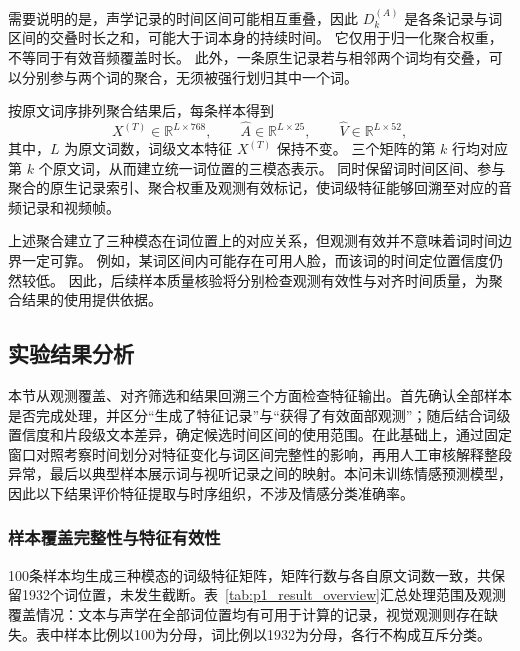 需要说明的是，声学记录的时间区间可能相互重叠，因此
$D_k^{(A)}$ 是各条记录与词区间的交叠时长之和，可能大于词本身的持续时间。
它仅用于归一化聚合权重，不等同于有效音频覆盖时长。
此外，一条原生记录若与相邻两个词均有交叠，可以分别参与两个词的聚合，无须被强行划归其中一个词。

按原文词序排列聚合结果后，每条样本得到
\begin{equation}
X^{(T)}\in\mathbb{R}^{L\times768},
\qquad
\widehat{A}\in\mathbb{R}^{L\times25},
\qquad
\widehat{V}\in\mathbb{R}^{L\times52},
\label{eq:p1_aligned_feature_matrices}
\end{equation}
其中，$L$ 为原文词数，词级文本特征 $X^{(T)}$ 保持不变。
三个矩阵的第 $k$ 行均对应第 $k$ 个原文词，从而建立统一词位置的三模态表示。
同时保留词时间区间、参与聚合的原生记录索引、聚合权重及观测有效标记，使词级特征能够回溯至对应的音频记录和视频帧。

上述聚合建立了三种模态在词位置上的对应关系，但观测有效并不意味着词时间边界一定可靠。
例如，某词区间内可能存在可用人脸，而该词的时间定位置信度仍然较低。
因此，后续样本质量核验将分别检查观测有效性与对齐时间质量，为聚合结果的使用提供依据。

\subsection{实验结果分析}
\label{sec:p1_results}

本节从观测覆盖、对齐筛选和结果回溯三个方面检查特征输出。首先确认全部样本是否完成处理，并区分“生成了特征记录”与“获得了有效面部观测”；随后结合词级置信度和片段级文本差异，确定候选时间区间的使用范围。在此基础上，通过固定窗口对照考察时间划分对特征变化与词区间完整性的影响，再用人工审核解释整段异常，最后以典型样本展示词与视听记录之间的映射。本问未训练情感预测模型，因此以下结果评价特征提取与时序组织，不涉及情感分类准确率。

\subsubsection{样本覆盖完整性与特征有效性}
\label{sec:p1_quality_scope}

100条样本均生成三种模态的词级特征矩阵，矩阵行数与各自原文词数一致，共保留1932个词位置，未发生截断。表~\ref{tab:p1_result_overview}汇总处理范围及观测覆盖情况：文本与声学在全部词位置均有可用于计算的记录，视觉观测则存在缺失。表中样本比例以100为分母，词比例以1932为分母，各行不构成互斥分类。

